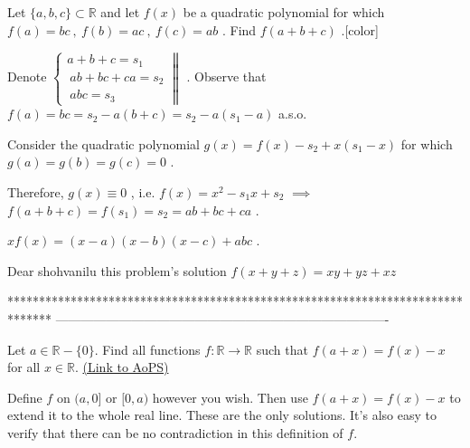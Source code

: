 \begin{solution} Let $\{a,b,c\}\subset\mathbb R$ and let $f(x)$ be a quadratic polynomial for which  $f(a)=bc\ ,\ f(b)=ac\ ,\ f(c)=ab$ . Find $f(a+b+c)$ .[\/color]

 Denote $\left\{\begin{array}{c}
a+b+c=s_1\\\
ab+bc+ca=s_2\\\
abc=s_3\end{array}\right\|$ . Observe that $f(a)=bc=s_2-a(b+c)=s_2-a(s_1-a)$ a.s.o. 

Consider the quadratic polynomial $g(x)=f(x)-s_2+x(s_1-x)$ for which $g(a)=g(b)=g(c)=0$ . 

Therefore, $g(x)\equiv 0$ , i.e. $f(x)=x^2-s_1x+s_2$ $\implies$ $f(a+b+c)=f(s_1)=s_2=ab+bc+ca$ . 

\begin{bolded}Remark\end{underlined}.\end{bolded} $xf(x)=(x-a)(x-b)(x-c)+abc$ .
\end{solution}



\begin{solution}
	Dear shohvanilu this problem's solution $f(x+y+z)=xy+yz+xz$
\end{solution}
*******************************************************************************
-------------------------------------------------------------------------------

\begin{problem}
	Let $a\in\mathbb{R}-\{0\}$. Find all functions $f: \mathbb{R}\to\mathbb{R}$ such that $f(a+x) = f(x) - x$ for all $x\in\mathbb{R}$.
	\flushright \href{https://artofproblemsolving.com/community/c6h472699}{(Link to AoPS)}
\end{problem}



\begin{solution}
	Define $f$ on $(a, 0]$ or $[0, a)$ however you wish.  Then use $f(a+x)=f(x)-x$ to extend it to the whole real line.  These are the only solutions.  It's also easy to verify that there can be no contradiction in this definition of $f$.
\end{solution}



